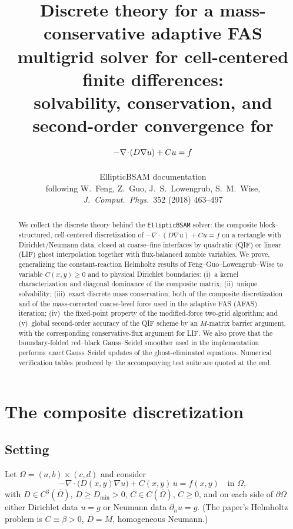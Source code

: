\documentclass[11pt]{article}
\title{Discrete theory for a mass-conservative adaptive FAS multigrid
solver for cell-centered finite differences:\\
solvability, conservation, and second-order convergence for
$-\dive(D\nabla u)+Cu=f$}
\author{EllipticBSAM documentation\\[2pt]
\small following W.~Feng, Z.~Guo, J.~S.~Lowengrub, S.~M.~Wise,
\emph{J.~Comput.~Phys.}~352 (2018) 463--497}
\date{}
\theoremstyle{remark}
\newcommand{\dive}{\nabla\!\cdot\!}
\begin{document}
\maketitle

\begin{abstract}
We collect the discrete theory behind the \texttt{EllipticBSAM} solver:
the composite block-structured, cell-centered discretization of
$-\dive(D\nabla u)+Cu=f$ on a rectangle with Dirichlet/Neumann data,
closed at coarse--fine interfaces by quadratic (QIF) or linear (LIF)
ghost interpolation together with flux-balanced zombie variables.
We prove, generalizing the constant-reaction Helmholtz results of
Feng--Guo--Lowengrub--Wise to variable $C(x,y)\ge 0$ and to physical
Dirichlet boundaries: (i)~a kernel characterization and diagonal
dominance of the composite matrix; (ii)~unique solvability;
(iii)~exact discrete mass conservation, both of the composite
discretization and of the mass-corrected coarse-level force used in the
adaptive FAS (AFAS) iteration; (iv)~the fixed-point property of the
modified-force two-grid algorithm; and (v)~global second-order accuracy
of the QIF scheme by an $M$-matrix barrier argument, with the
corresponding conservative-flux argument for LIF\@.  We also prove that
the boundary-folded red--black Gauss--Seidel smoother used in the
implementation performs \emph{exact} Gauss--Seidel updates of the
ghost-eliminated equations.  Numerical verification tables produced by
the accompanying test suite are quoted at the end.
\end{abstract}

\section{The composite discretization}\label{sec:disc}

\subsection{Setting}
Let $\Omega=(a,b)\times(c,d)$ and consider
\begin{equation}\label{eq:pde}
  -\dive\bigl(D(x,y)\nabla u\bigr) + C(x,y)\,u = f(x,y)\quad\text{in }\Omega,
\end{equation}
with $D\in C^3(\overline\Omega)$, $D\ge D_{\min}>0$, $C\in
C(\overline\Omega)$, $C\ge 0$, and on each side of $\partial\Omega$
either Dirichlet data $u=g$ or Neumann data $\partial_n u=g$.  (The
paper's Helmholtz problem is $C\equiv\beta>0$, $D=M$, homogeneous
Neumann.)
\end{document}
